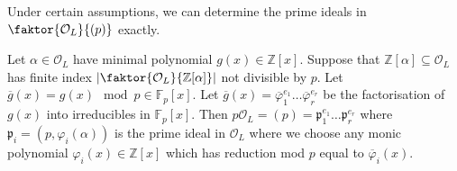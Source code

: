 Under certain assumptions, we can determine the prime ideals in \( \faktor{\mathcal O_L}{(p)} \) exactly.
\begin{theorem}
    Let \( \alpha \in \mathcal O_L \) have minimal polynomial \( g(x) \in \mathbb Z[x] \).
    Suppose that \( \mathbb Z[\alpha] \subseteq \mathcal O_L \) has finite index \( \abs{\faktor{\mathcal O_L}{\mathbb Z[\alpha]}} \) not divisible by \( p \).
    Let \( \overline g(x) = g(x) \mod p \in \mathbb F_p[x] \).
    Let \( \overline g(x) = \overline \varphi_1^{e_1} \dots \overline \varphi_r^{e_r} \) be the factorisation of \( g(x) \) into irreducibles in \( \mathbb F_p[x] \).
    Then \( p\mathcal O_L = (p) = \mathfrak p_1^{e_1} \dots \mathfrak p_r^{e_r} \) where \( \mathfrak p_i = (p, \varphi_i(\alpha)) \) is the prime ideal in \( \mathcal O_L \) where we choose any monic polynomial \( \varphi_i(x) \in \mathbb Z[x] \) which has reduction mod \( p \) equal to \( \overline \varphi_i(x) \).
\end{theorem}
